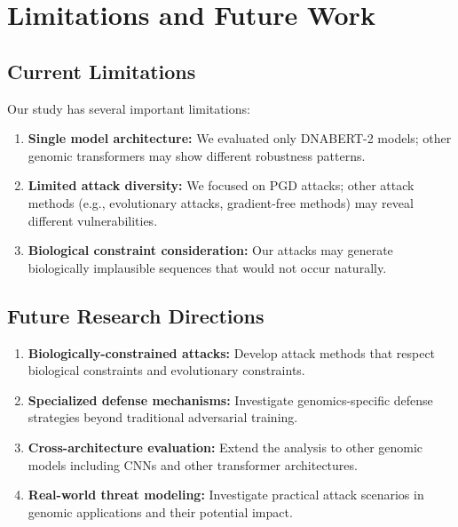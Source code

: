 \documentclass{article} %
\begin{document}
\section{Limitations and Future Work}

\subsection{Current Limitations}

Our study has several important limitations:

\begin{enumerate}
    \item \textbf{Single model architecture:} We evaluated only DNABERT-2 models; other genomic transformers may show different robustness patterns.
    
    \item \textbf{Limited attack diversity:} We focused on PGD attacks; other attack methods (e.g., evolutionary attacks, gradient-free methods) may reveal different vulnerabilities.
    
    \item \textbf{Biological constraint consideration:} Our attacks may generate biologically implausible sequences that would not occur naturally.
\end{enumerate}

\subsection{Future Research Directions}

\begin{enumerate}
    \item \textbf{Biologically-constrained attacks:} Develop attack methods that respect biological constraints and evolutionary constraints.
    
    \item \textbf{Specialized defense mechanisms:} Investigate genomics-specific defense strategies beyond traditional adversarial training.
    
    \item \textbf{Cross-architecture evaluation:} Extend the analysis to other genomic models including CNNs and other transformer architectures.
    
    \item \textbf{Real-world threat modeling:} Investigate practical attack scenarios in genomic applications and their potential impact.
\end{enumerate}
\end{document}
